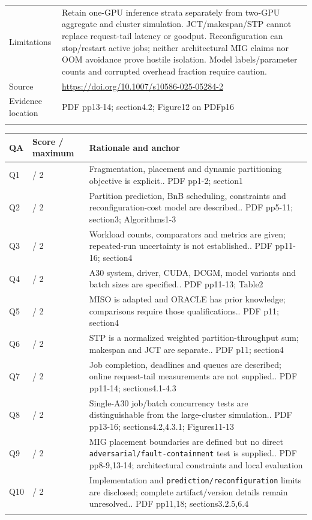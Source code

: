 \begin{longtable}{>{\raggedright\arraybackslash}p{}>{\raggedright\arraybackslash}p{}}
Limitations & Retain one-GPU inference strata separately from two-GPU aggregate and cluster simulation. JCT/makespan/STP cannot replace request-tail latency or goodput. Reconfiguration can stop/restart active jobs; neither architectural MIG claims nor OOM avoidance prove hostile isolation. Model labels/parameter counts and corrupted overhead fraction require caution.\\\addlinespace
Source & \url{https://doi.org/10.1007/s10586-025-05284-2}\\\addlinespace
Evidence location & PDF pp13-14; section4.2; Figure12 on PDFp16\\\addlinespace
\bottomrule\end{longtable}

\begin{longtable}{>{\raggedright\arraybackslash}p{}>{\raggedright\arraybackslash}p{}>{\raggedright\arraybackslash}p{}}
\toprule
\textbf{QA} & \textbf{Score / maximum} & \textbf{Rationale and anchor}\\\midrule\endhead
Q1 & 2 / 2 & Fragmentation, placement and dynamic partitioning objective is explicit.. PDF pp1-2; section1\\\addlinespace
Q2 & 2 / 2 & Partition prediction, BnB scheduling, constraints and reconfiguration-cost model are described.. PDF pp5-11; section3; Algorithms1-3\\\addlinespace
Q3 & 1 / 2 & Workload counts, comparators and metrics are given; repeated-run uncertainty is not established.. PDF pp11-16; section4\\\addlinespace
Q4 & 2 / 2 & A30 system, driver, CUDA, DCGM, model variants and batch sizes are specified.. PDF pp11-13; Table2\\\addlinespace
Q5 & 1 / 2 & MISO is adapted and ORACLE has prior knowledge; comparisons require those qualifications.. PDF p11; section4\\\addlinespace
Q6 & 2 / 2 & STP is a normalized weighted partition-throughput sum; makespan and JCT are separate.. PDF p11; section4\\\addlinespace
Q7 & 1 / 2 & Job completion, deadlines and queues are described; online request-tail measurements are not supplied.. PDF pp11-14; sections4.1-4.3\\\addlinespace
Q8 & 2 / 2 & Single-A30 job/batch concurrency tests are distinguishable from the large-cluster simulation.. PDF pp13-16; sections4.2,4.3.1; Figures11-13\\\addlinespace
Q9 & 1 / 2 & MIG placement boundaries are defined but no direct \nolinkurl{adversarial/fault-containment} test is supplied.. PDF pp8-9,13-14; architectural constraints and local evaluation\\\addlinespace
Q10 & 1 / 2 & Implementation and \nolinkurl{prediction/reconfiguration} limits are disclosed; complete artifact/version details remain unresolved.. PDF pp11,18; sections3.2.5,6.4\\\addlinespace
\bottomrule\end{longtable}

